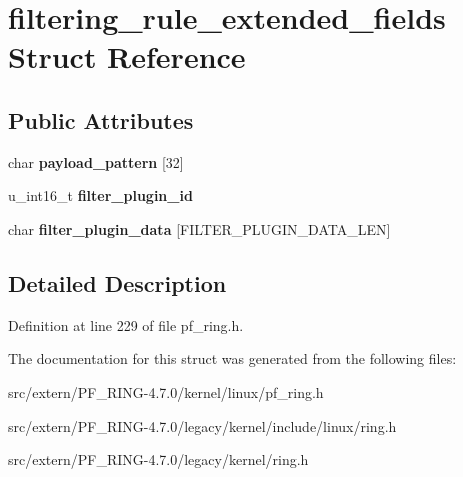 \hypertarget{structfiltering__rule__extended__fields}{
\section{filtering\_\-rule\_\-extended\_\-fields Struct Reference}
\label{structfiltering__rule__extended__fields}
}
\subsection*{Public Attributes}
\begin{DoxyCompactItemize}
\item 
\hypertarget{structfiltering__rule__extended__fields_a713ac45adce5f616045400eba5ae2736}{
char {\bfseries payload\_\-pattern} \mbox{[}32\mbox{]}}
\label{structfiltering__rule__extended__fields_a713ac45adce5f616045400eba5ae2736}

\item 
\hypertarget{structfiltering__rule__extended__fields_ae1ec0df263a11732428c5d2f9339e71e}{
u\_\-int16\_\-t {\bfseries filter\_\-plugin\_\-id}}
\label{structfiltering__rule__extended__fields_ae1ec0df263a11732428c5d2f9339e71e}

\item 
\hypertarget{structfiltering__rule__extended__fields_a733ff865d5411ddc65c8a1f79e9f9ba1}{
char {\bfseries filter\_\-plugin\_\-data} \mbox{[}FILTER\_\-PLUGIN\_\-DATA\_\-LEN\mbox{]}}
\label{structfiltering__rule__extended__fields_a733ff865d5411ddc65c8a1f79e9f9ba1}

\end{DoxyCompactItemize}


\subsection{Detailed Description}


Definition at line 229 of file pf\_\-ring.h.



The documentation for this struct was generated from the following files:\begin{DoxyCompactItemize}
\item 
src/extern/PF\_\-RING-\/4.7.0/kernel/linux/pf\_\-ring.h\item 
src/extern/PF\_\-RING-\/4.7.0/legacy/kernel/include/linux/ring.h\item 
src/extern/PF\_\-RING-\/4.7.0/legacy/kernel/ring.h\end{DoxyCompactItemize}
